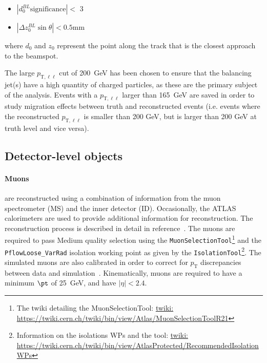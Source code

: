 \begin{itemize}
    \item $|d_0^{BL}\text{significance}| < $ 3
    \item $|\Delta z_0^{BL}\sin\theta| < 0.5 $mm
\end{itemize}

where $d_0$ and $z_0$ represent the point along the track that is the closest approach to the beamspot.

The large $p_{\text{T},\ell\ell}$ cut of 200~GeV has been chosen to ensure that the balancing jet(s) have a high quantity of charged particles, as these are the primary subject of the analysis.
Events with a $p_{\text{T},\ell\ell}$ larger than 165~GeV are saved in order to study migration effects between truth and reconstructed events (i.e. events where the reconstructed $p_{\text{T},\ell\ell}$
is smaller than 200 GeV, but is larger than 200 GeV at truth level and vice versa).

\subsection{Detector-level objects}

\paragraph{Muons} are reconstructed using a combination of information from the muon spectrometer (MS) and the inner detector (ID). Occasionally, the ATLAS calorimeters are used to provide additional information for reconstruction. The reconstruction process is described in detail in reference~\cite{Aad:2016jkr}.
The muons are required to pass Medium quality selection using the \texttt{MuonSelectionTool}\footnote{The twiki detailing the MuonSelectionTool: \url{twiki: https://twiki.cern.ch/twiki/bin/view/Atlas/MuonSelectionToolR21}} and the \texttt{PflowLoose\_VarRad} isolation working point as given by
the \texttt{IsolationTool}\footnote{Information on the isolations WPs and the tool: \url{twiki: https://twiki.cern.ch/twiki/bin/view/AtlasProtected/RecommendedIsolationWPs}}. The simulated muons are also calibrated in order to correct for $p_\text{T}$ discrepancies between data and simulation~\cite{Aad:2016jkr}.
Kinematically, muons are required to have a minimum $\pt$ of 25~GeV, and have $|\eta|<2.4$.

